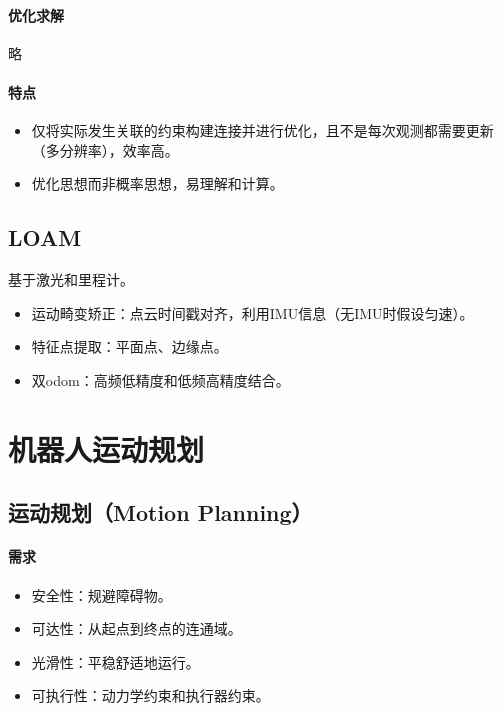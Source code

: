 \documentclass[
12pt, %
a4paper, 
oneside, %
headinclude,footinclude, %
]{scrartcl}
\begin{document}
\paragraph{优化求解}
略
\paragraph{特点}
\begin{itemize}
\item 仅将实际发生关联的约束构建连接并进行优化，且不是每次观测都需要更新（多分辨率），效率高。
\item 优化思想而非概率思想，易理解和计算。
\end{itemize}
\subsection[LOAM]{LOAM}
基于激光和里程计。
\begin{itemize}
\item 运动畸变矫正：点云时间戳对齐，利用IMU信息（无IMU时假设匀速）。
\item 特征点提取：平面点、边缘点。
\item 双odom：高频低精度和低频高精度结合。
\end{itemize}
\section{机器人运动规划}
\subsection[运动规划]{运动规划（Motion Planning）}
\paragraph{需求}
\begin{itemize}
\item 安全性：规避障碍物。
\item 可达性：从起点到终点的连通域。
\item 光滑性：平稳舒适地运行。
\item 可执行性：动力学约束和执行器约束。
\end{itemize}
\end{document}
